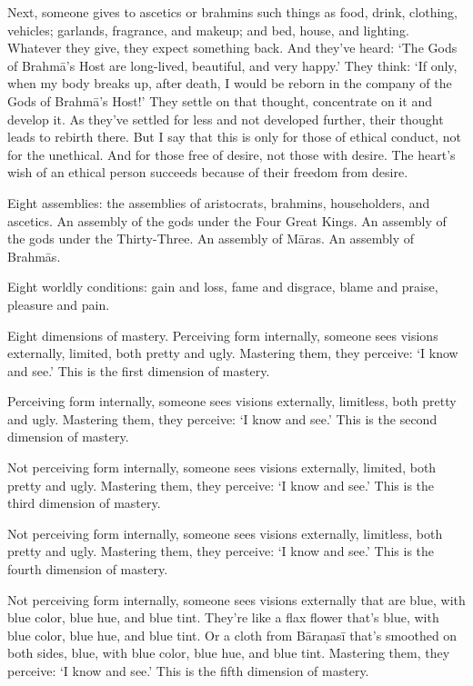 \documentclass[12pt,openany]{book}%
\begin{document}
Next, someone gives to ascetics or brahmins such things as food, drink, clothing, vehicles; garlands, fragrance, and makeup; and bed, house, and lighting. Whatever they give, they expect something back. And they’ve heard: ‘The Gods of \textsanskrit{Brahmā}’s Host are long-lived, beautiful, and very happy.’ They think: ‘If only, when my body breaks up, after death, I would be reborn in the company of the Gods of \textsanskrit{Brahmā}’s Host!’ They settle on that thought, concentrate on it and develop it. As they’ve settled for less and not developed further, their thought leads to rebirth there. But I say that this is only for those of ethical conduct, not for the unethical. And for those free of desire, not those with desire. The heart’s wish of an ethical person succeeds because of their freedom from desire. 

Eight assemblies: the assemblies of aristocrats, brahmins, householders, and ascetics. An assembly of the gods under the Four Great Kings. An assembly of the gods under the Thirty-Three. An assembly of \textsanskrit{Māras}. An assembly of \textsanskrit{Brahmās}. 

Eight worldly conditions: gain and loss, fame and disgrace, blame and praise, pleasure and pain. 

Eight dimensions of mastery. Perceiving form internally, someone sees visions externally, limited, both pretty and ugly. Mastering them, they perceive: ‘I know and see.’ This is the first dimension of mastery. 

Perceiving form internally, someone sees visions externally, limitless, both pretty and ugly. Mastering them, they perceive: ‘I know and see.’ This is the second dimension of mastery. 

Not perceiving form internally, someone sees visions externally, limited, both pretty and ugly. Mastering them, they perceive: ‘I know and see.’ This is the third dimension of mastery. 

Not perceiving form internally, someone sees visions externally, limitless, both pretty and ugly. Mastering them, they perceive: ‘I know and see.’ This is the fourth dimension of mastery. 

Not perceiving form internally, someone sees visions externally that are blue, with blue color, blue hue, and blue tint. They’re like a flax flower that’s blue, with blue color, blue hue, and blue tint. Or a cloth from \textsanskrit{Bāraṇasī} that’s smoothed on both sides, blue, with blue color, blue hue, and blue tint. Mastering them, they perceive: ‘I know and see.’ This is the fifth dimension of mastery. 
\end{document}
